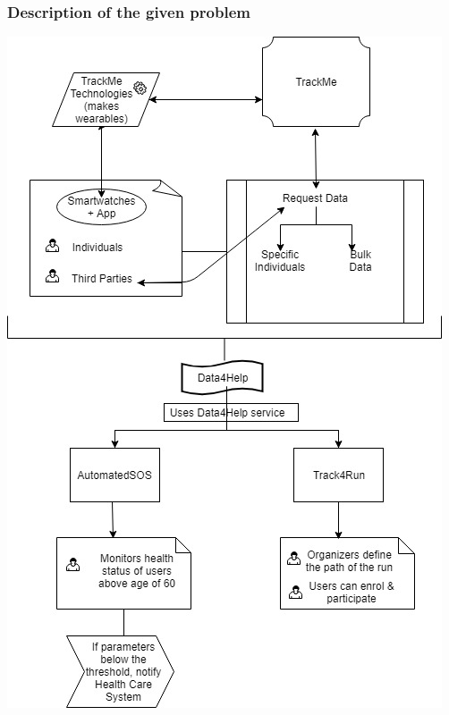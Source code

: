 \documentclass[12pt]{article}
\begin{document}
\subsubsection{Description of the given problem}
\includegraphics[scale=0.45]{Diagrams/High_level.jpg}\\
\\
\end{document}
